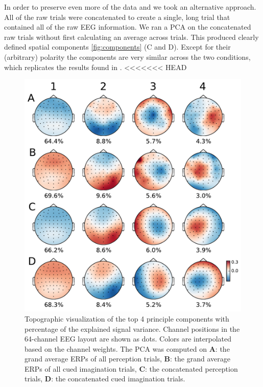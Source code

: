 In order to preserve even more of the data and we took an alternative approach. 
All of the raw trials were concatenated to create a single, long trial that contained all of the raw EEG information.
We ran a \ac{PCA} on the concatenated raw trials without first calculating an average across trials. 
This produced clearly defined spatial components \autoref{fig:components} (C and D).
Except for their (arbitrary) polarity the components are very similar across the two conditions, which replicates the results found in \cite{schaefer_name_2011}.
<<<<<<< HEAD

\begin{figure}[t] 
  \begin{center}
    \includegraphics[scale=0.5]{Figures/principle_components.pdf}
    \caption{%
Topographic visualization of the top 4 principle components with percentage of the explained signal variance.
Channel positions in the 64-channel EEG layout are shown as dots.
Colors are interpolated based on the channel weights.
The PCA was computed on
\textbf{A}: the grand average \acp{ERP} of all perception trials,
\textbf{B}: the grand average \acp{ERP} of all cued imagination trials,
\textbf{C}: the concatenated perception trials,
\textbf{D}: the concatenated cued imagination trials.
}
    \label{fig:components}
  \end{center}
\end{figure}


